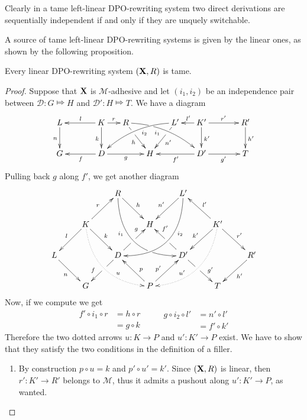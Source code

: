 \documentclass[a4paper,UKenglish,cleveref,pdftex, thm-restate,numberwithinsect]{lipics}
\def\R{\mathsf{R}}
\def\X{\textbf {\textup{X}}}
\newcommand{\dder}[1]{\mathscr{#1}}
\begin{document}
\begin{remark}
  Clearly in a tame left-linear DPO-rewriting system two direct derivations are sequentially independent if and only if they are unquely switchable.
\end{remark}

A source of tame left-linear DPO-rewriting systems is given by the linear ones, as shown by the following proposition.

\begin{proposition}\label{prop:equi}Every linear DPO-rewriting system $(\X, \R)$ is tame.
 \end{proposition}
\begin{proof} Suppose that $\X$ is $\mathcal{M}$-adhesive and let $(i_1, i_2)$ be an independence pair between $\dder{D}\colon G\Mapsto H$ and $\dder{D}'\colon H\Mapsto T$. We have a diagram
	\[\xymatrix@C=15pt{L \ar[d]_{n}&& K \ar[d]_{k}\ar[ll]_{l} \ar[r]^{r} & R \ar@/^.35cm/[drrr]|(.3)\hole_(.4){i_1} \ar[dr]|(.3)\hole_{h} && L' \ar@/_.35cm/[dlll]^(.4){i_2} \ar[dl]|(.3)\hole^{n'}& K' \ar[d]^{k'}\ar[l]_{l'} \ar[rr]^{r'} && R' \ar[d]^{h'}\\G && \ar[ll]^{f} D \ar[rr]_{g}&& H  && \ar[ll]^{f'} D' \ar[rr]_{g'}&& T}\]
Pulling back $g$ along $f'$, we get another diagram 
	\[\xymatrix{&&R \ar@/_1cm/[ddrr]_(.35){i_1}|(.7)\hole \ar[dr]^{h}&& L'\ar@/^1cm/[ddll]^(.35){i_2}  \ar[dl]_{n'}\\&K\ar[dr]^{k}\ar[dl]_{l} \ar@{.>}@/_.8cm/[ddrr]^(.65){u}\ar[ur]^{r}&& H && K' \ar@{.>}@/^.8cm/[ddll]_(.65){u'}\ar[dl]_{k'}\ar[lu]_{l'} \ar[dr]^{r'}\\L \ar[dr]_{n} && D \ar[dl]|(.42)\hole_(.64){f}\ar[ur]|(.48)\hole^(.7){g}&&D' \ar[dr]|(.42)\hole^(.65){g'} \ar[ul]|(.48)\hole_(.7){f'}&&R'\ar[dl]^{h'}\\&G &&P\ar[ur]^(.4){p'}\ar[ul]_(.4){p}&&T}\] 
Now, if we compute we get
\[\begin{split}
	f'\circ i_1\circ r &= h\circ r \\&= g\circ k
\end{split}\qquad \begin{split}
g\circ i_2\circ l' &= n'\circ l'\\&=f'\circ k'
\end{split}\]
Therefore the two dotted arrows $u\colon K\to P$ and $u'\colon K'\to P$ exist. We have to show that they satisfy the two conditions in the definition of a filler. 
\begin{enumerate}
	\item  By construction $p\circ u = k$ and $p'\circ u'=k'$. Since $(\X, \R)$ is linear, then $r'\colon K'\to R'$ belongs to $\mathcal{M}$, thus it admits a pushout along $u'\colon K'\to P$, as wanted.

\end{enumerate}
\end{proof}
\end{document}
